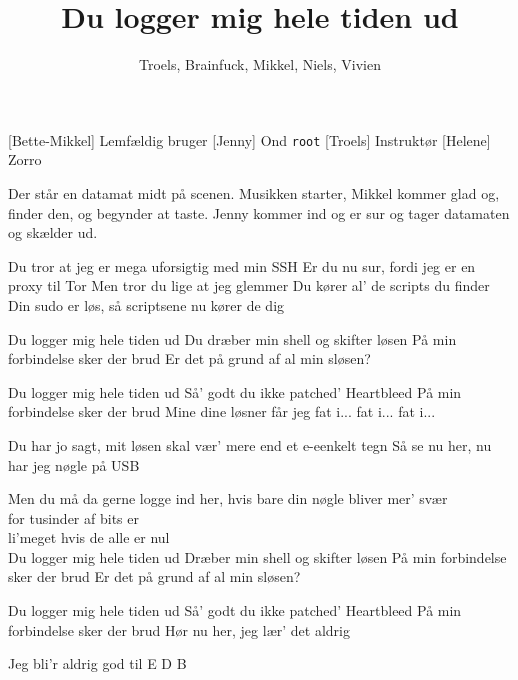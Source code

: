 \documentclass[a4paper,11pt]{article}
\title{Du logger mig hele tiden ud}
\author{Troels, Brainfuck, Mikkel, Niels, Vivien}
\begin{document}
\maketitle

\begin{roles}
[Bette-Mikkel] Lemfældig bruger
[Jenny] Ond \texttt{root}
[Troels] Instruktør
[Helene] Zorro
\end{roles}

\begin{sketch}
  Der står en datamat midt på scenen.  Musikken starter, Mikkel kommer
  glad og, finder den, og begynder at taste.  Jenny kommer ind og er
  sur og tager datamaten og skælder ud.
\end{sketch}

\begin{song}

  Du tror at jeg er mega uforsigtig med min SSH
  Er du nu sur, fordi jeg er en proxy til Tor
  Men tror du lige at jeg glemmer
  Du kører al' de scripts du finder
  Din sudo er løs,
  så scriptsene nu kører de dig

  Du logger mig hele tiden ud
  Du dræber min shell og skifter løsen
  På min forbindelse sker der brud
  Er det på grund af al min sløsen?

  Du logger mig hele tiden ud
  Så' godt du ikke patched' Heartbleed
  På min forbindelse sker der brud
  Mine dine løsner får jeg fat i... fat i... fat i...


  Du har jo sagt, mit løsen skal vær' mere end et e-eenkelt tegn
  Så se nu her, nu har jeg nøgle på USB

  Men du må da gerne logge ind her,
  hvis bare din nøgle bliver mer' svær\\    %
  for tusinder af bits er\\                 %
  li'meget hvis de alle er nul\\            %

  Du logger mig hele tiden ud
  Dræber min shell og skifter løsen
  På min forbindelse sker der brud
  Er det på grund af al min sløsen?

  Du logger mig hele tiden ud
  Så' godt du ikke patched' Heartbleed
  På min forbindelse sker der brud
  Hør nu her, jeg lær' det aldrig

  Jeg bli'r aldrig god til E D B
\end{song}
\end{document}
